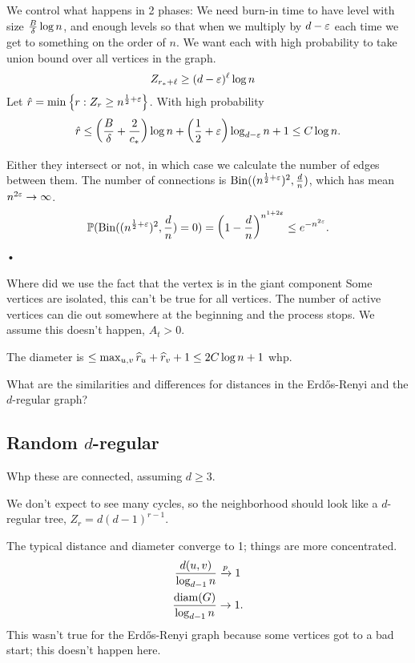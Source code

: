 We control what happens in 2 phases:
We need burn-in time to have level with size $\frac{B}{\delta}\log n$, and enough levels so that when we multiply by $d-\varepsilon$ each time we get to something on the order of $n$.
We want each with high probability to take union bound over all vertices in the graph.
\begin{align}
Z_{r_*+\ell} &\ge (d-\varepsilon)^\ell \log n
\end{align}
Let $\hat r = \min\left\{{r}:{Z_r\ge n^{\frac{1}{2}+\varepsilon}}\right\}$. With high probability \begin{align}\hat r \le \left( {\frac{B}{\delta} + \frac{2}{c_*}} \right)\log n + \left( {\frac{1}{2} + \varepsilon} \right)\log_{d-\varepsilon}n + 1\le C\log n.\end{align}

Either they intersect or not, in which case we calculate the number of edges between them.
The number of connections is $\operatorname{Bin}((n^{\frac{1}{2} + \varepsilon})^2, \frac{d}{n})$, which has mean $n^{2\varepsilon}\to \infty$. 
\begin{align}
\mathbb{P}(\operatorname{Bin}((n^{\frac{1}{2}+\varepsilon})^2, \frac{d}{n})=0) = \left( {1-\frac{d}{n}} \right)^{n^{1+2\varepsilon}}\le e^{-n^{2\varepsilon}}.
\end{align}•

Where did we use the fact that the vertex is in the giant component
Some vertices are isolated, this can't be true for all vertices. The number of active vertices can die out somewhere at the beginning and the process stops. We assume this doesn't happen, $A_t>0$.

The diameter is $\le \max_{u,v} \widehat{r}_u + \widehat{r}_v + 1\le 2C \log n+1$ whp.

What are the similarities and differences for distances in the Erd\H os-Renyi and the $d$-regular graph?

\subsection{Random $d$-regular}
Whp these are connected, assuming $d\ge 3$.

We don't expect to see many cycles, so the neighborhood should look like a $d$-regular tree, $Z_r=d(d-1)^{r-1}$.

The typical distance and diameter converge to 1; things are more concentrated.
\begin{align}
\frac{d(u,v)}{\log_{d-1}n} &\xrightarrow{p}1\\
\frac{\operatorname{diam}(G)}{\log_{d-1}n} &\to 1.
\end{align}
This wasn't true for the Erd\H os-Renyi graph because some vertices got to a bad start; this doesn't happen here.

